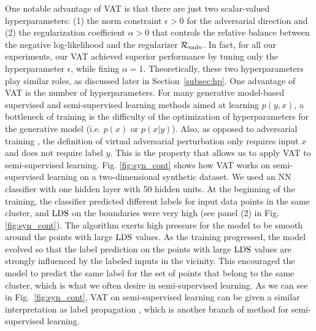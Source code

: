 \documentclass[10pt,journal,compsoc]{IEEEtran}
\newcommand\new[1]{\textcolor{blue}{#1}}
\begin{document}
One notable advantage of VAT is that there are just two scalar-valued hyperparameters: (1) the norm constraint $\epsilon>0$ for the adversarial direction and (2) the regularization coefficient  $\alpha>0$ that controls the relative balance between the negative log-likelihood and the regularizer $\mathcal{R}_{\rm vadv}$. 
In fact, for all our experiments, our VAT achieved superior performance by tuning only the hyperparameter $\epsilon$, while fixing $\alpha=1$.
Theoretically, these two hyperparameters play similar roles, as discussed later in Section~\ref{subsec:hp}.
One advantage of VAT is the number of hyperparameters. 
For many generative model-based supervised and semi-supervised learning methods aimed at learning $p(y,x)$, a bottleneck of training is the difficulty of the optimization of hyperparameters for the generative model (i.e. $p(x)$ or $p(x|y)$). 
Also, as opposed to adversarial training \cite{goodfellow2014explaining}, the definition of virtual adversarial perturbation only requires input $x$ and does not require label $y$.  
This is the property that allows us to apply VAT to semi-supervised learning. 
Fig. \ref{fig:syn_cont} shows how VAT works on semi-supervised learning on a two-dimensional synthetic dataset. 
We used an NN classifier with one hidden layer with 50 hidden units. 
At the beginning of the training, the classifier predicted different labels for input data points in the same cluster, and ${\rm LDS}$ on the boundaries were very high (see panel (2) in Fig. \ref{fig:syn_cont}).
The algorithm exerts high pressure for the model to be smooth around the points with large ${\rm LDS}$ values. 
As the training progressed, the model evolved so that the label prediction on the points with large ${\rm LDS}$ values are strongly influenced by the labeled inputs in the vicinity.  This encouraged the model to predict the same label for the set of points that belong to the same cluster, which is what we often desire in semi-supervised learning. 
As we can see in Fig.~\ref{fig:syn_cont}, VAT on semi-supervised learning can be given a similar interpretation as label propagation \cite{zhu2002learning}, which is another branch of method for semi-supervised learning. 
\end{document}
